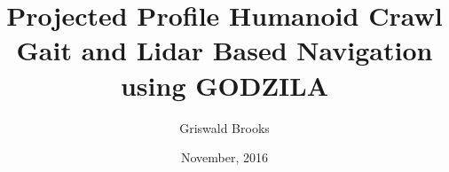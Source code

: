 



%


%
\graphicspath{{./pictures/}}


\renewcommand{\baselinestretch}{1.6}
\newtheorem{theorem}{Theorem}[chapter]
\newcommand{\btheorem}{\begin{theorem}\rm}
\newcommand{\etheorem}{$\diamond$\end{theorem}}
\newtheorem{definition}{Definition}[chapter]
\newcommand{\bdefn}{\begin{definition}\rm}
\newcommand{\edefn}{\end{definition}}
\newtheorem{lemma}{Lemma}[chapter]
\newtheorem{remark}{Remark}[chapter]
\newcommand{\bremark}{\begin{remark}\rm}
\newcommand{\eremark}{\end{remark}}
\newtheorem{example}{Example}[chapter]
\newcommand{\bexample}{\begin{example}\rm}
\newcommand{\eexample}{\end{example}}
\newtheorem{assumption}{Assumption}[chapter]
\newcommand{\bassump}{\begin{assumption}\rm}
\newcommand{\eassump}{\end{assumption}}


\title{Projected Profile Humanoid Crawl Gait and Lidar Based Navigation using GODZILA}
\author{Griswald Brooks}
\date{November, 2016}


